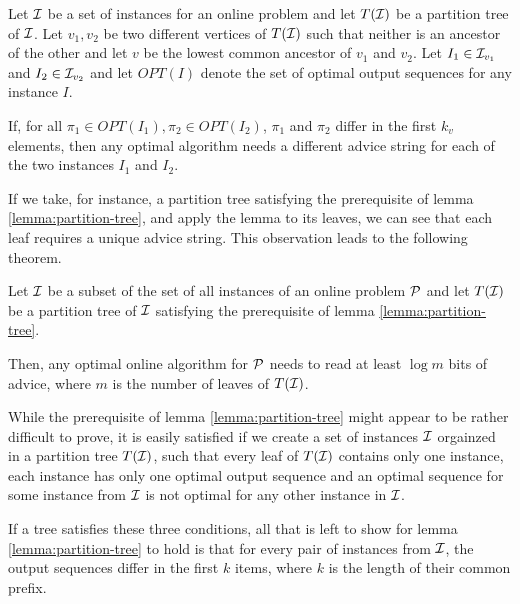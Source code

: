 \begin{lemma}\label{lemma:partition-tree}
    Let $\mathcal{I}$ be a set of instances for an online problem and let $T(\mathcal{I})$
    be a partition tree of $\mathcal{I}$. Let $v_1, v_2$ be two different vertices
    of $T(\mathcal{I})$ such that neither is an ancestor of the other and let $v$
    be the lowest common ancestor of $v_1$ and $v_2$. Let $I_1 \in
    \mathcal{I}_{v_1}$ and $I_2 \in \mathcal{I}_{v_2}$ and let $OPT(I)$ denote the set of
    optimal output sequences for any instance $I$.

    If, for all $\pi_1 \in OPT(I_1), \pi_2 \in OPT(I_2)$, $\pi_1$ and
    $\pi_2$ differ in the first $k_v$ elements, then any optimal algorithm
    needs a different advice string for each of the two instances $I_1$
    and $I_2$.
\end{lemma}

If we take, for instance, a partition tree satisfying the prerequisite of
lemma \ref{lemma:partition-tree}, and apply the lemma to its leaves, we
can see that each leaf requires a unique advice string. This observation
leads to the following theorem.

\begin{theorem}\label{theorem:partition-tree}
    Let $\mathcal{I}$ be a subset of the set of all instances of an online problem
    $\mathcal{P}$ and let $T(\mathcal{I})$ be a partition tree of $\mathcal{I}$
    satisfying the prerequisite of lemma \ref{lemma:partition-tree}.

    Then, any optimal online algorithm for $\mathcal{P}$ needs to read
    at least $\log{}m$ bits of advice, where $m$ is the number of leaves
    of $T(\mathcal{I})$.
\end{theorem}

While the prerequisite of lemma \ref{lemma:partition-tree} might appear to
be rather difficult to prove, it is easily satisfied if we create a set of
instances $\mathcal{I}$ orgainzed in a partition tree $T(\mathcal{I})$, such that every leaf
of $T(\mathcal{I})$ contains only one instance, each instance has only one optimal
output sequence and an optimal sequence for some instance from $\mathcal{I}$ is not
optimal for any other instance in $\mathcal{I}$.

If a tree satisfies these three conditions, all that is left to show for
lemma \ref{lemma:partition-tree} to hold is that for every pair of
instances from $\mathcal{I}$, the output sequences differ in the first $k$ items,
where $k$ is the length of their common prefix.
